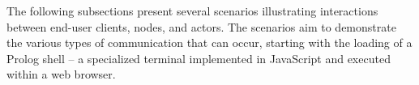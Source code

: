 %
%
%
%
%
%
%
%
%


The following subsections present several scenarios illustrating interactions between end-user clients, nodes, and actors. The scenarios aim to demonstrate the various types of communication that can occur, starting with the loading of a Prolog shell -- a specialized terminal implemented in JavaScript and executed within a web browser.

